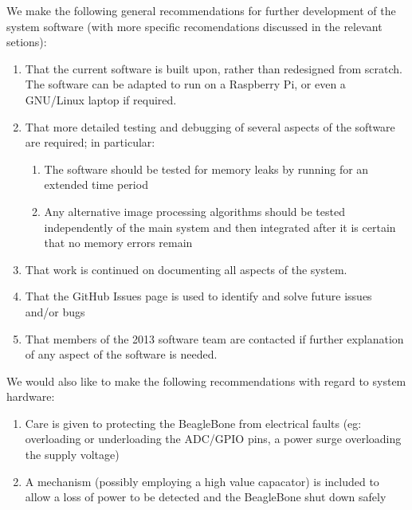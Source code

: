 We make the following general recommendations for further development of the system software (with more specific recomendations discussed in the relevant setions):
\begin{enumerate}
	\item That the current software is built upon, rather than redesigned from scratch. The software can be adapted to run on a Raspberry Pi, or even a GNU/Linux laptop if required.
	\item That more detailed testing and debugging of several aspects of the software are required; in particular:
	\begin{enumerate}
		\item The software should be tested for memory leaks by running for an extended time period
		\item Any alternative image processing algorithms should be tested independently of the main system and then integrated after it is certain that no memory errors remain
	\end{enumerate}
	\item That work is continued on documenting all aspects of the system.
	\item That the GitHub Issues page\cite{github_issues} is used to identify and solve future issues and/or bugs
	\item That members of the 2013 software team are contacted if further explanation of any aspect of the software is needed.
\end{enumerate}

We would also like to make the following recommendations with regard to system hardware:
\begin{enumerate}
	\item Care is given to protecting the BeagleBone from electrical faults (eg: overloading or underloading the ADC/GPIO pins, a power surge overloading the supply voltage)
	\item A mechanism (possibly employing a high value capacator) is included to allow a loss of power to be detected and the BeagleBone shut down safely
\end{enumerate}



